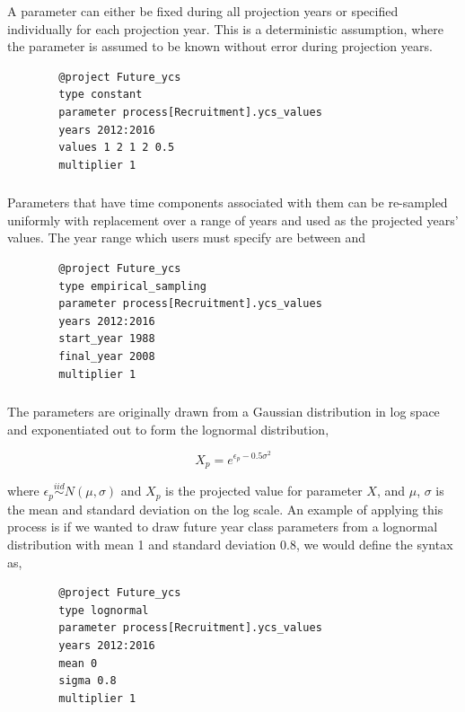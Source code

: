 A parameter can either be fixed during all projection years or specified individually for each projection year. This is a deterministic assumption, where the parameter is assumed to be known without error during projection years.

{\small{\begin{verbatim}
		@project Future_ycs
		type constant
		parameter process[Recruitment].ycs_values
		years 2012:2016
		values 1 2 1 2 0.5
		multiplier 1
		\end{verbatim}}}

\subsubsection[Empirical resampling]{}

Parameters that have time components associated with them can be re-sampled uniformly with replacement over a range of years and used as the projected years' values. The year range which users must specify are between  and 
{\small{\begin{verbatim}
		@project Future_ycs
		type empirical_sampling
		parameter process[Recruitment].ycs_values
		years 2012:2016
		start_year 1988
		final_year 2008
		multiplier 1
		\end{verbatim}}}


\subsubsection[Lognormal]{}

The parameters are originally drawn from a Gaussian distribution in log space and exponentiated out to form the lognormal distribution,

\begin{equation}\label{eq:lognormal}
X_p = e^{\epsilon_p- 0.5\sigma^2}
\end{equation}

where $\epsilon_p\stackrel{iid}{\sim}N(\mu,\sigma)$ and $X_p$ is the projected value for parameter $X$, and $\mu$, $\sigma$ is the mean and standard deviation on the log scale. An example of applying this process is if we wanted to draw future year class parameters from a lognormal distribution with mean 1 and standard deviation 0.8, we would define the syntax as,

{\small{\begin{verbatim}
		@project Future_ycs
		type lognormal
		parameter process[Recruitment].ycs_values
		years 2012:2016
		mean 0
		sigma 0.8
		multiplier 1
		\end{verbatim}}}

